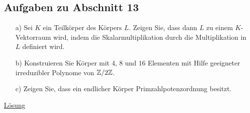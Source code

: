 \subsection{Aufgaben zu Abschnitt 13}

\begin{exe}\label{aufgabe:13.1}
	\begin{enumerate}
		\item[a)]
		Sei $ K $ ein Teilkörper des Körpers $ L $.
		Zeigen Sie, dass dann $ L $ zu einem $ K $- Vektorraum wird,
		indem die Skalarmultiplikation durch die Multiplikation in $ L $
		definiert wird.
		
		\item[b)]
		Konstruieren Sie Körper mit $ 4$, $ 8 $ und $ 16 $ Elementen
		mit Hilfe geeigneter irreduzibler Polynome von $ \mathbb{Z} / 2 \mathbb{Z} $.
		
		\item[c)]
		Zeigen Sie, dass ein endlicher Körper Primzahlpotenzordnung besitzt.   
	\end{enumerate}
	\hyperlink{loes:13.1}{Lösung}
\end{exe}